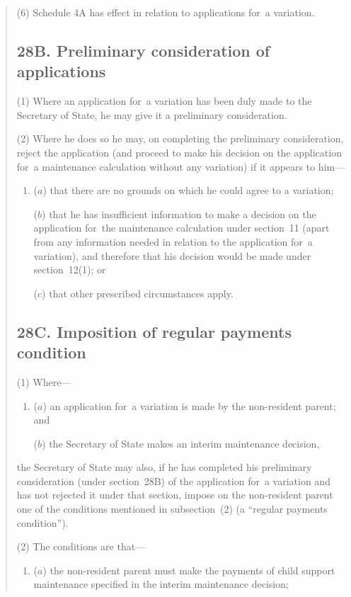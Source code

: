 \documentclass[12pt,a4paper]{article}
\begin{document}
\begin{quotation}
(6) Schedule 4A has effect in relation to applications for~a variation.

\subsection*{28B. Preliminary consideration of applications}

(1) Where an application for~a variation has been duly made to the Secretary of State, he may give it a preliminary consideration.

(2) Where he does so he may, on completing the preliminary consideration, reject the application (and proceed to make his decision on the application for~a maintenance calculation without any variation) if it appears to him—
\begin{enumerate}\item[]
($a$) that there are no grounds on which he could agree to a variation;

($b$) that he has insufficient information to make a decision on the application for~the maintenance calculation under section~11 (apart from any information needed in relation to the application for~a variation), and therefore that his decision would be made under section~12(1); or

($c$) that other prescribed circumstances apply.
\end{enumerate}

\subsection*{28C. Imposition of regular payments condition}

(1) Where—
\begin{enumerate}\item[]
($a$) an application for~a variation is made by the non-resident parent; and

($b$) the Secretary of State makes an interim maintenance decision,
\end{enumerate}
the Secretary of State may also, if he has completed his preliminary consideration (under section~28B) of the application for~a variation and has not rejected it under that section, impose on the non-resident parent one of the conditions mentioned in subsection~(2)  (a “regular payments condition”).

(2) The conditions are that—
\begin{enumerate}\item[]
($a$) the non-resident parent must make the payments of child support maintenance specified in the interim maintenance decision;


\end{enumerate}
\end{quotation}
\end{document}
